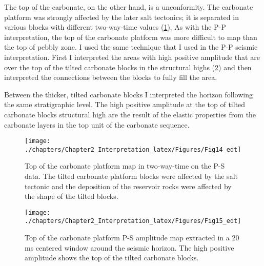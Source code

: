 The top of the carbonate, on the other hand, is a unconformity. The carbonate platform was strongly affected by the later salt tectonics; it is separated in various blocks with different two-way-time values (\ref{fig:map_mac_time_PS}). As with the P-P interpretation, the top of the carbonate platform was more difficult to map than the top of pebbly zone. I used the same technique that I used in the P-P seismic interpretation. First I interpreted the areas with high positive amplitude that are over the top of the tilted carbonate blocks in the structural highs  (\ref{fig:map_mac_amp_PS})  and then interpreted the connections between the blocks to fully fill the area. 



Between the thicker, tilted carbonate blocks  I interpreted the horizon following the same stratigraphic level. The high positive amplitude at the top of tilted carbonate blocks structural high are the result of the elastic properties from the carbonate layers in the top unit of the carbonate sequence.

\begin{figure}[hbtp]
	\begin{center}
	\texttt{[image: ./chapters/Chapter2\_Interpretation\_latex/Figures/Fig14\_edt]}
			\caption[Top of the carbonate platform map in two-way-time on the P-S data. ]{Top of the carbonate platform map in two-way-time on the P-S data. The tilted carbonate platform blocks were affected by the salt tectonic and the deposition of the reservoir rocks were affected by the shape of the tilted blocks.}
			\label{fig:map_mac_time_PS}
		\end{center}
	\end{figure}


\begin{figure}[hbtp]
	\begin{center}
	\texttt{[image: ./chapters/Chapter2\_Interpretation\_latex/Figures/Fig15\_edt]}
			\caption[Top of the carbonate platform P-S amplitude map extracted in a 20 ms centered window around the seismic horizon. ]{Top of the carbonate platform P-S amplitude map extracted in a 20 ms centered window around the seismic horizon. The high positive amplitude shows the top of the tilted carbonate blocks. }
			\label{fig:map_mac_amp_PS}
		\end{center}
	\end{figure}


